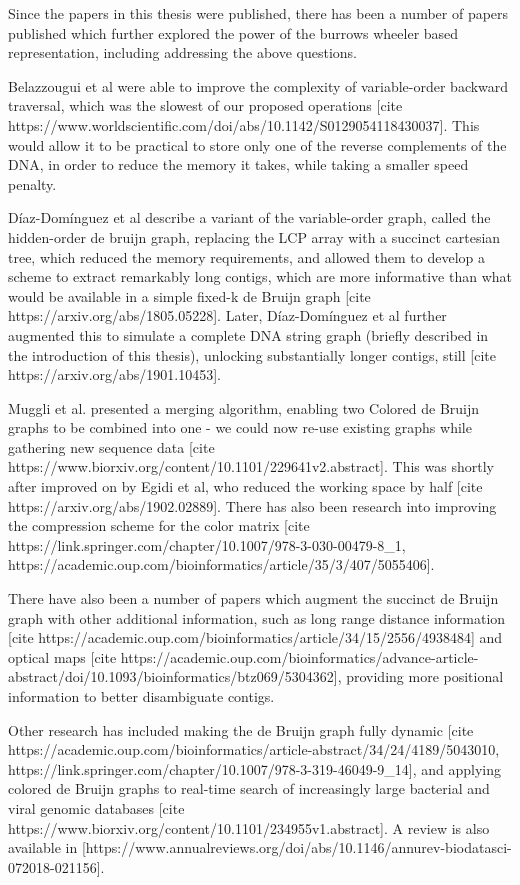 Since the papers in this thesis were published, there has been a number of papers published which further explored the power of the burrows wheeler based representation, including addressing the above questions.

Belazzougui et al were able to improve the complexity of variable-order backward traversal, which was the slowest of our proposed operations [cite https://www.worldscientific.com/doi/abs/10.1142/S0129054118430037]. This would allow it to be practical to store only one of the reverse complements of the DNA, in order to reduce the memory it takes, while taking a smaller speed penalty.

Díaz-Domínguez et al describe a variant of the variable-order graph, called the hidden-order de bruijn graph, replacing the LCP array with a succinct cartesian tree, which reduced the memory requirements, and allowed them to develop a scheme to extract remarkably long contigs, which are more informative than what would be available in a simple fixed-k de Bruijn graph [cite https://arxiv.org/abs/1805.05228]. Later, Díaz-Domínguez et al further augmented this to simulate a complete DNA string graph (briefly described in the introduction of this thesis), unlocking substantially longer contigs, still [cite https://arxiv.org/abs/1901.10453].

Muggli et al. presented a merging algorithm, enabling two Colored de Bruijn graphs to be combined into one - we could now re-use existing graphs while gathering new sequence data [cite https://www.biorxiv.org/content/10.1101/229641v2.abstract]. This was shortly after improved on by Egidi et al, who reduced the working space by half [cite https://arxiv.org/abs/1902.02889]. There has also been research into improving the compression scheme for the color matrix [cite https://link.springer.com/chapter/10.1007/978-3-030-00479-8_1, https://academic.oup.com/bioinformatics/article/35/3/407/5055406].

There have also been a number of papers which augment the succinct de Bruijn graph with other additional information, such as long range distance information [cite https://academic.oup.com/bioinformatics/article/34/15/2556/4938484] and optical maps [cite https://academic.oup.com/bioinformatics/advance-article-abstract/doi/10.1093/bioinformatics/btz069/5304362], providing more positional information to better disambiguate contigs.

Other research has included making the de Bruijn graph fully dynamic [cite https://academic.oup.com/bioinformatics/article-abstract/34/24/4189/5043010, https://link.springer.com/chapter/10.1007/978-3-319-46049-9_14], and applying colored de Bruijn graphs to real-time search of increasingly large bacterial and viral genomic databases [cite https://www.biorxiv.org/content/10.1101/234955v1.abstract]. A review is also available in  [https://www.annualreviews.org/doi/abs/10.1146/annurev-biodatasci-072018-021156].


